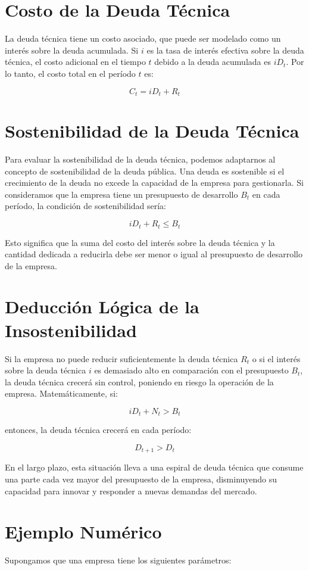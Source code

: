 \documentclass[12pt]{article}
\begin{document}
\section{Costo de la Deuda Técnica}
La deuda técnica tiene un costo asociado, que puede ser modelado como un interés sobre la deuda acumulada. Si \(i\) es la tasa de interés efectiva sobre la deuda técnica, el costo adicional en el tiempo \(t\) debido a la deuda acumulada es \(iD_t\). Por lo tanto, el costo total en el período \(t\) es:

\[
C_t = iD_t + R_t
\]

\section{Sostenibilidad de la Deuda Técnica}
Para evaluar la sostenibilidad de la deuda técnica, podemos adaptarnos al concepto de sostenibilidad de la deuda pública. Una deuda es sostenible si el crecimiento de la deuda no excede la capacidad de la empresa para gestionarla. Si consideramos que la empresa tiene un presupuesto de desarrollo \(B_t\) en cada período, la condición de sostenibilidad sería:

\[
iD_t + R_t \leq B_t
\]

Esto significa que la suma del costo del interés sobre la deuda técnica y la cantidad dedicada a reducirla debe ser menor o igual al presupuesto de desarrollo de la empresa.

\section{Deducción Lógica de la Insostenibilidad}
Si la empresa no puede reducir suficientemente la deuda técnica \(R_t\) o si el interés sobre la deuda técnica \(i\) es demasiado alto en comparación con el presupuesto \(B_t\), la deuda técnica crecerá sin control, poniendo en riesgo la operación de la empresa. Matemáticamente, si:

\[
iD_t + N_t > B_t
\]

entonces, la deuda técnica crecerá en cada período:

\[
D_{t+1} > D_t
\]

En el largo plazo, esta situación lleva a una espiral de deuda técnica que consume una parte cada vez mayor del presupuesto de la empresa, disminuyendo su capacidad para innovar y responder a nuevas demandas del mercado.

\section{Ejemplo Numérico}
Supongamos que una empresa tiene los siguientes parámetros:
\end{document}
